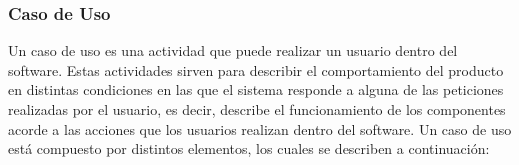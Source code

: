 \subsubsection{Caso de Uso}

Un caso de uso es una actividad que puede realizar un usuario dentro del software. Estas actividades sirven para describir el comportamiento del producto en distintas condiciones en las que el sistema responde a alguna de las peticiones realizadas por el usuario, es decir, describe el funcionamiento de
los componentes acorde a las acciones que los usuarios realizan dentro del software.
Un caso de uso está compuesto por distintos elementos, los cuales se describen a continuación: